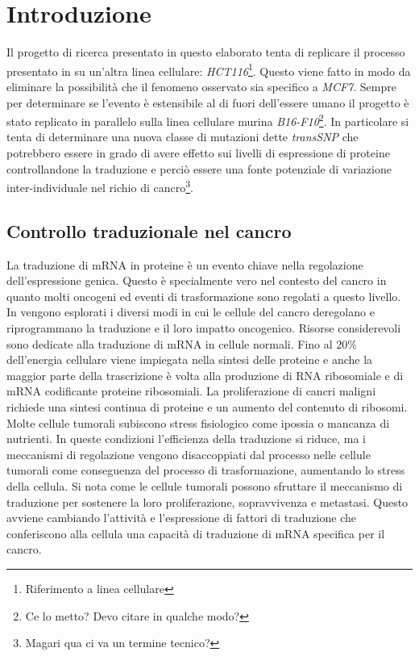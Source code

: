 \chapter{Introduzione}
\label{cha:intro}




Il progetto di ricerca presentato in questo elaborato tenta di replicare il processo presentato in \cite{transsnp} su un'altra linea cellulare: \emph{HCT116}\footnote{Riferimento a linea cellulare}.
Questo viene fatto in modo da eliminare la possibilit\`a che il fenomeno osservato sia specifico a \emph{MCF7}.
Sempre per determinare se l'evento \`e estensibile al di fuori dell'essere umano il progetto \`e stato replicato in parallelo sulla linea cellulare murina \emph{B16-F10}\footnote{Ce lo metto? Devo citare in qualche modo?}.
In particolare si tenta di determinare una nuova classe di mutazioni dette \emph{transSNP} che potrebbero essere in grado di avere effetto sui livelli di espressione di proteine controllandone la traduzione e perci\`o essere una fonte potenziale di variazione inter-individuale nel richio di cancro\footnote{Magari qua ci va un termine tecnico?}.

\section{Controllo traduzionale nel cancro}
La traduzione di mRNA in proteine \`e un evento chiave nella regolazione dell'espressione genica.
Questo \`e specialmente vero nel contesto del cancro in quanto molti oncogeni ed eventi di trasformazione sono regolati a questo livello.
In \cite{tranconcancer} vengono esplorati i diversi modi in cui le cellule del cancro deregolano e riprogrammano la traduzione e il loro impatto oncogenico.
Risorse considerevoli sono dedicate alla traduzione di mRNA in cellule normali.
Fino al $20\%$ dell'energia cellulare viene impiegata nella sintesi delle proteine e anche la maggior parte della trascrizione \`e volta alla produzione di RNA ribosomiale e di mRNA codificante proteine ribosomiali.
La proliferazione di cancri maligni richiede una sintesi continua di proteine e un aumento del contenuto di ribosomi.
Molte cellule tumorali subiscono stress fisiologico come ipossia o mancanza di nutrienti.
In queste condizioni l'efficienza della traduzione si riduce, ma i meccanismi di regolazione vengono disaccoppiati dal processo nelle cellule tumorali come conseguenza del processo di trasformazione, aumentando lo stress della cellula.
Si nota come le cellule tumorali possono sfruttare il meccanismo di traduzione per sostenere la loro proliferazione, sopravvivenza e metastasi.
Questo avviene cambiando l'attivit\`a e l'espressione di fattori di traduzione che conferiscono alla cellula una capacit\`a di traduzione di mRNA specifica per il cancro.

